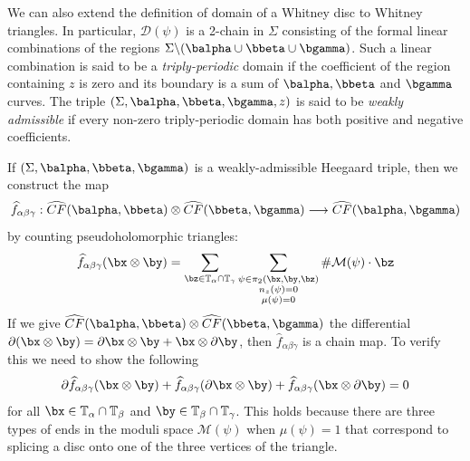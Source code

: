 We can also extend the definition of domain of a Whitney disc to Whitney triangles. In particular, $\mathcal D(\psi)$ is a 2-chain in $\Sigma$ consisting of the formal linear combinations of the regions $\Sigma \backslash (\balpha\cup\bbeta\cup\bgamma)$. Such a linear combination is said to be a \emph{triply-periodic} domain if the coefficient of the region containing $z$ is zero and its boundary is a sum of $\balpha,\bbeta$ and $\bgamma$ curves. The triple $(\Sigma,\balpha,\bbeta,\bgamma,z)$ is said to be \emph{weakly admissible} if every non-zero triply-periodic domain has both positive and negative coefficients. 


If $(\Sigma,\balpha,\bbeta,\bgamma)$ is a weakly-admissible Heegaard triple, then we construct the map
\[ \widehat{f}_{\alpha\beta\gamma} : \widehat{CF}(\balpha,\bbeta) \otimes \widehat{CF}(\bbeta,\bgamma) \longrightarrow \widehat{CF}(\balpha,\bgamma) \]
by counting pseudoholomorphic triangles:
\begin{equation}
\label{counting pseudoholomorphic triangles}
\widehat{f}_{\alpha\beta\gamma}(\bx \otimes \by) = \sum_{\bz \in \mathbb T_\alpha \cap \mathbb T_\gamma} \sum_{\substack{\psi \in \pi_2(\bx,\by,\bz) \\ n_z(\psi)=0 \\ \mu(\psi)=0}} \# \mathcal M(\psi) \cdot \bz 
\end{equation}
If we give $\widehat{CF}(\balpha,\bbeta) \otimes \widehat{CF}(\bbeta,\bgamma)$ the differential $\partial(\bx\otimes\by)=\partial\bx\otimes\by+\bx\otimes\partial\by$, then $\widehat{f}_{\alpha\beta\gamma}$ is a chain map. To verify this we need to show the following
\[ \partial \widehat{f}_{\alpha\beta\gamma}(\bx\otimes\by) + \widehat{f}_{\alpha\beta\gamma}(\partial\bx\otimes\by) + \widehat{f}_{\alpha\beta\gamma}(\bx\otimes\partial\by) = 0 \]
for all $\bx \in \mathbb T_\alpha \cap \mathbb T_\beta$ and $\by \in \mathbb T_\beta \cap \mathbb T_\gamma$. This holds because there are three types of ends in the moduli space $\mathcal M(\psi)$ when $\mu(\psi)=1$ that correspond to splicing a disc onto one of the three vertices of the triangle.

